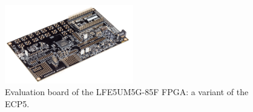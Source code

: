\begin{figure}
\centering
\includegraphics[width=0.5\textwidth]{images/ECP5.png}
\caption[Evaluation board of the LFE5UM5G-85F FPGA: a variant of the ECP5.]{Evaluation board of the LFE5UM5G-85F FPGA: a variant of the ECP5.\footnotemark}
\label{fig:evaluationboard}
\end{figure}



